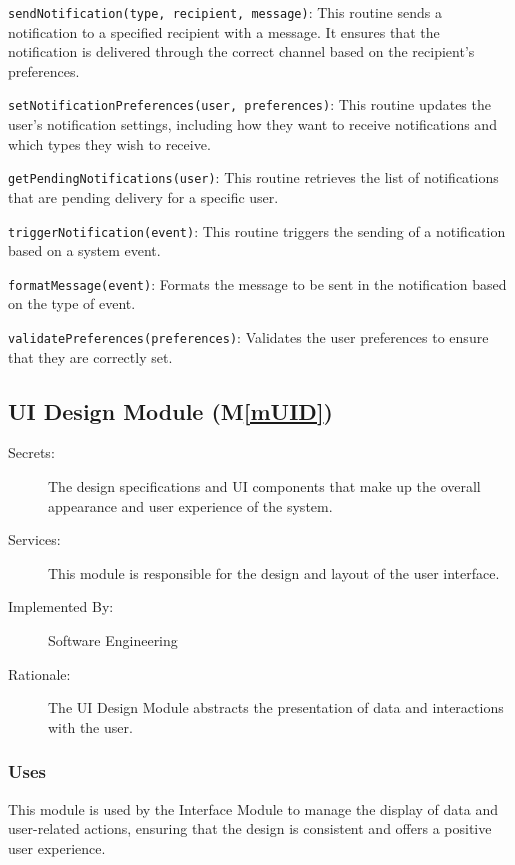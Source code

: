 \documentclass[12pt, titlepage]{article}
\newcommand{\mref}[1]{M\ref{#1}}
\begin{document}
\begin{description}
  \item[Access Routine Semantics:]
  \item \texttt{sendNotification(type, recipient, message)}: This routine sends a notification to a 
  specified recipient with a message. It ensures that the notification is delivered through the correct 
  channel based on the recipient's preferences.
  \item \texttt{setNotificationPreferences(user, preferences)}: This routine updates the user's notification 
  settings, including how they want to receive notifications and which types they wish to receive.
  \item \texttt{getPendingNotifications(user)}: This routine retrieves the list of notifications that are 
  pending delivery for a specific user.
  \item \texttt{triggerNotification(event)}: This routine triggers the sending of a notification based on 
  a system event.
  \item 

  \item[Local Function:] 
  \item \texttt{formatMessage(event)}: Formats the message to be sent in the notification based on the 
  type of event.
  \item \texttt{validatePreferences(preferences)}: Validates the user preferences to ensure that they are 
  correctly set.
\end{description}

\subsection{UI Design Module (\mref{mUID})}
\begin{description}
  \item[Secrets:] The design specifications and UI components that make  up the
  overall appearance and user experience of the system.
  \item[Services:] This module is responsible for the design and layout of the
  user interface.
  \item[Implemented By:] Software Engineering
  \item[Rationale:] The UI Design Module abstracts the presentation of data and
  interactions with the user.
\end{description}

\subsubsection{Uses}
This module is used by the Interface Module to manage the display of data and
user-related actions, ensuring that the design is consistent and offers a
positive user experience.
\end{document}
